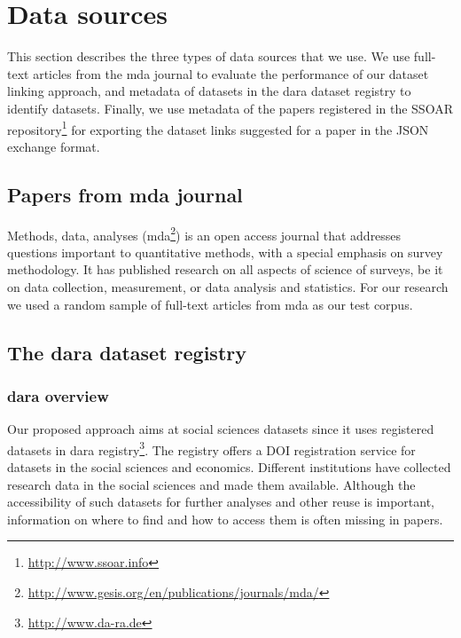 \documentclass{IOS-Book-Article}
\newcommand{\dara}{\textsf{da\textbar ra}}
\begin{document}
\section{Data sources}
\label{sec:data}
This section describes the three types of data sources that we use. We use full-text articles from the mda journal to evaluate the performance of our dataset linking approach, and metadata of datasets in the {\dara} dataset registry to identify datasets. 
Finally, we use metadata of the papers registered in the SSOAR repository\footnote{\url{http://www.ssoar.info}} for exporting the dataset links suggested for a paper in the JSON exchange format.
 
 \subsection{Papers from mda journal}\label{sec:mda}
 
 Methods, data, analyses (mda\footnote{\url{http://www.gesis.org/en/publications/journals/mda/}}) is an open access journal that addresses questions important to quantitative methods, with a special emphasis on survey methodology.
 It has published research on all aspects of science of surveys, be it on data collection, measurement, or data analysis and statistics.
 For our research we used a random sample of full-text articles from mda as our test corpus.
  \subsection{The {\dara} dataset registry}
  
  \subsubsection{{\dara} overview}
  Our proposed approach aims at social sciences datasets since it uses registered datasets in {\dara} registry\footnote{\url{http://www.da-ra.de}}.
  The registry offers a DOI registration service for datasets in the social sciences and economics. 
  Different institutions have collected research data in the social sciences and made them available.
  Although the accessibility of such datasets for further analyses and other reuse is important, information on where to find and how to access them is often missing in papers.
  
\end{document}
